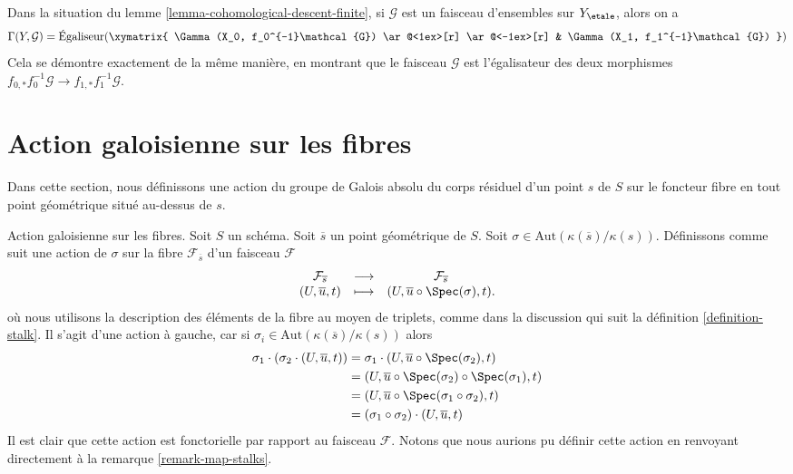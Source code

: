 \begin{remark}
\label{remark-cohomological-descent-finite}
Dans la situation du lemme \ref{lemma-cohomological-descent-finite},
si $\mathcal{G}$ est un faisceau d'ensembles sur $Y_\etale$, alors on a
$$
\Gamma(Y, \mathcal{G}) =
\text{\'Egaliseur}(
\xymatrix{
\Gamma(X_0, f_0^{-1}\mathcal{G})
\ar@<1ex>[r] \ar@<-1ex>[r] &
\Gamma(X_1, f_1^{-1}\mathcal{G})
}
)
$$
Cela se d\'emontre exactement de la m\^eme mani\`ere, en montrant que
le faisceau $\mathcal{G}$ est l'\'egalisateur des deux morphismes
$f_{0, *}f_0^{-1}\mathcal{G} \to f_{1, *}f_1^{-1}\mathcal{G}$.
\end{remark}









\section{Action galoisienne sur les fibres}
\label{section-galois-action-stalks}

\noindent
Dans cette section, nous d\'efinissons une action du groupe de Galois absolu du corps
r\'esiduel d'un point $s$ de $S$ sur le foncteur fibre en tout point g\'eom\'etrique situ\'e
au-dessus de $s$.

\medskip\noindent
Action galoisienne sur les fibres.
Soit $S$ un sch\'ema.
Soit $\overline{s}$ un point g\'eom\'etrique de $S$.
Soit $\sigma \in \text{Aut}(\kappa(\overline{s})/\kappa(s))$.
D\'efinissons comme suit une action de $\sigma$ sur la fibre $\mathcal{F}_{\overline{s}}$
d'un faisceau $\mathcal{F}$
\begin{equation}
\label{equation-galois-action}
\begin{matrix}
\mathcal{F}_{\overline{s}} &
\longrightarrow &
\mathcal{F}_{\overline{s}} \\
(U, \overline{u}, t) &
\longmapsto &
(U, \overline{u} \circ \Spec(\sigma), t).
\end{matrix}
\end{equation}
o\`u nous utilisons la description des \'el\'ements de la fibre au moyen de triplets,
comme dans la discussion qui suit la
d\'efinition \ref{definition-stalk}.
Il s'agit d'une action \`a gauche, car si
$\sigma_i \in \text{Aut}(\kappa(\overline{s})/\kappa(s))$
alors
\begin{align*}
\sigma_1 \cdot (\sigma_2 \cdot (U, \overline{u}, t))
& =
\sigma_1 \cdot (U, \overline{u} \circ \Spec(\sigma_2), t) \\
& =
(U, \overline{u} \circ \Spec(\sigma_2) \circ \Spec(\sigma_1), t) \\
& =
(U, \overline{u} \circ \Spec(\sigma_1 \circ \sigma_2), t) \\
& =
(\sigma_1 \circ \sigma_2) \cdot (U, \overline{u}, t)
\end{align*}
Il est clair que cette action est fonctorielle par rapport au faisceau $\mathcal{F}$.
Notons que nous aurions pu d\'efinir cette action en renvoyant directement \`a la
remarque \ref{remark-map-stalks}.


